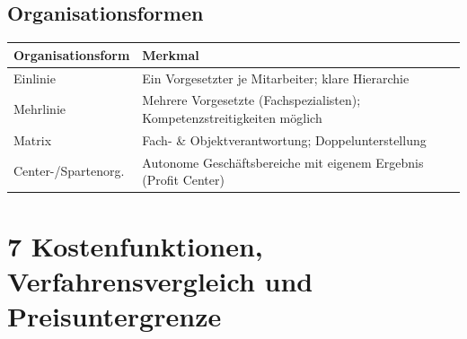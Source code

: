 \documentclass[10pt,a4paper]{article}
\begin{document}
\begin{multicols}{2}
\subsection{Organisationsformen}

\begin{tabular}{|L{3cm}|L{4.2cm}|}
\hline
{}
\textbf{Organisationsform} & \textbf{Merkmal} \\
\hline
Einlinie & Ein Vorgesetzter je Mitarbeiter; klare Hierarchie \\
\hline
Mehrlinie & Mehrere Vorgesetzte (Fachspezialisten); Kompetenzstreitigkeiten möglich \\
\hline
Matrix & Fach- \& Objektverantwortung; Doppelunterstellung \\
\hline
Center-/Spartenorg. & Autonome Geschäftsbereiche mit eigenem Ergebnis (Profit Center) \\
\hline
\end{tabular}

\end{multicols}

\newpage

\section{7 \quad Kostenfunktionen, Verfahrensvergleich und Preisuntergrenze}
\end{document}
